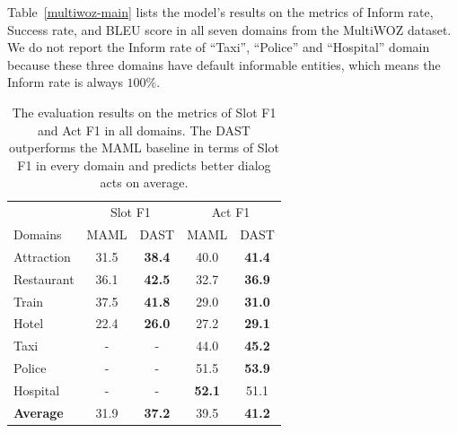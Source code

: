 \documentclass[letterpaper]{article} %
\begin{document}
%
Table~\ref{multiwoz-main} lists the model's results on the metrics of Inform rate, Success rate, and BLEU score in all seven domains from the MultiWOZ dataset. We do not report the Inform rate of ``Taxi'', ``Police'' and ``Hospital'' domain because these three domains have default informable entities, which means the Inform rate is always $100\%$.
%
%


\begin{table}[ht!]
\centering
\setlength{\extrarowheight}{0.06cm}
\small
\begin{tabular}[width=\columnwidth]{l|cccc}
\toprule
\hline
& \multicolumn{2}{c}{Slot F1} & \multicolumn{2}{c}{Act F1}\\
\cmidrule(lr){2-3} \cmidrule(lr){4-5} 
Domains  &MAML& DAST &MAML& DAST  \\ 
\hline
Attraction & 31.5                 & \textbf{38.4}                 & 40.0                 & \textbf{41.4}  \\
\hline
Restaurant & 36.1                 & \textbf{42.5 }                & 32.7                 & \textbf{36.9}  \\
\hline
Train     & 37.5                 & \textbf{41.8}                 & 29.0                 & \textbf{31.0}\\
\hline
Hotel& 22.4                 & \textbf{26.0}                 & 27.2                 & \textbf{29.1} \\
\hline
Taxi & -                & -               & 44.0                 & \textbf{45.2}                  \\
\hline
Police & -                 &-                & 51.5                 & \textbf{53.9 }                 \\
\hline
Hospital&-         & -      & \textbf{52.1}   & 51.1  \\
\hline
\textbf{Average}  & 31.9    & \textbf{37.2}  & 39.5   & \textbf{41.2}\\
\hline
\bottomrule
\end{tabular}
\caption{The evaluation results on the metrics of Slot F1 and Act F1 in all domains. The DAST outperforms the MAML baseline in terms of Slot F1 in every domain and predicts better dialog acts on average. }
\label{multiwoz_slot}
\end{table}
\end{document}
